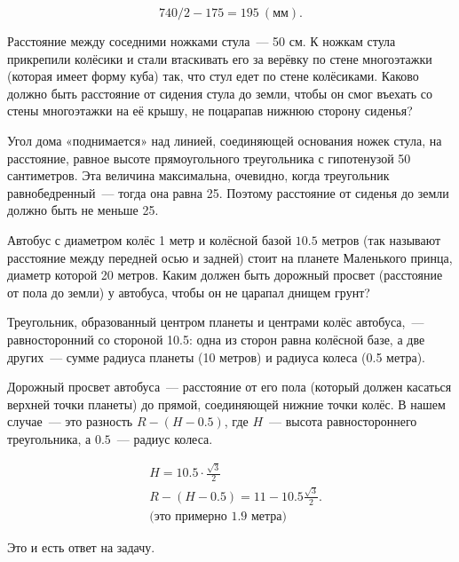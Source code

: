 \begin{itemize}

\itA $$740/2-175 = \SI{195}{(\text{мм})}.$$

\itB Расстояние между соседними ножками стула~— 50 см. К ножкам стула прикрепили колёсики и стали втаскивать его за верёвку по стене многоэтажки (которая имеет форму куба) так, что стул едет по стене колёсиками. Каково должно быть расстояние от сидения стула до земли, чтобы он смог въехать со стены многоэтажки на её крышу, не поцарапав нижнюю сторону сиденья?

Угол дома «поднимается» над линией, соединяющей основания ножек стула, на расстояние, равное высоте прямоугольного треугольника с гипотенузой 50 сантиметров. Эта величина максимальна, очевидно, когда треугольник равнобедренный~— тогда она равна \SI{25}{}. Поэтому расстояние от сиденья до земли должно быть не меньше \SI{25}{}.

\begin{center}  \end{center}

\itC Автобус с диаметром колёс 1 метр и колёсной базой $10.5$ метров (так называют расстояние между передней осью и задней) стоит на планете Маленького принца, диаметр которой 20 метров. Каким должен быть дорожный просвет (расстояние от пола до земли) у автобуса, чтобы он не царапал днищем грунт?

Треугольник, образованный центром планеты и центрами колёс автобуса,~— равносторонний со стороной \SI{10.5}{}: одна из сторон равна колёсной базе, а две других~— сумме радиуса планеты (10 метров) и радиуса колеса (0.5 метра).

\begin{center}
\end{center}

Дорожный просвет автобуса~— расстояние от его пола (который должен касаться верхней точки планеты) до прямой, соединяющей нижние точки колёс. В нашем случае~— это разность $R-(H-0.5)$, где $H$~— высота равностороннего треугольника, а $0.5$~— радиус колеса.

\begin{align*}
	& H = 10.5 \cdot \frac{\sqrt{3}}{2} \\
	& R-(H-0.5) = 11 - 10.5\frac{\sqrt{3}}{2}. \\
	& \text{(это примерно 1.9 метра)}
\end{align*}

Это и есть ответ на задачу.
\end{itemize}